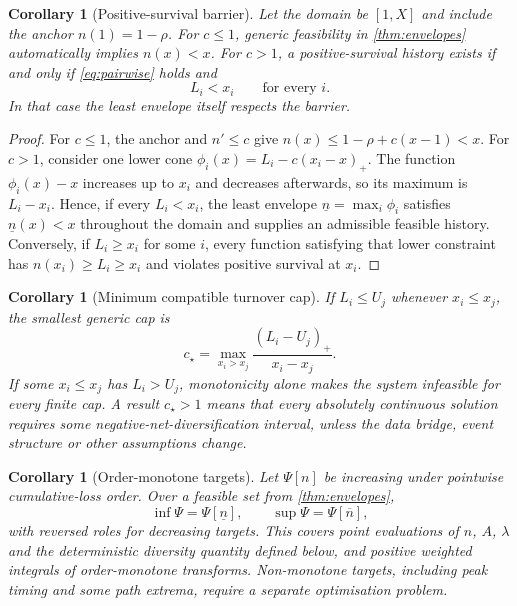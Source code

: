 \documentclass[11pt]{article}
\newtheorem{corollary}[theorem]{Corollary}
\theoremstyle{definition}
\begin{document}
\begin{corollary}[Positive-survival barrier]\label{cor:barrier}
Let the domain be $[1,X]$ and include the anchor $n(1)=1-\rho$. For $c\leq1$, generic feasibility in \cref{thm:envelopes} automatically implies $n(x)<x$. For $c>1$, a positive-survival history exists if and only if \eqref{eq:pairwise} holds and
\begin{equation}
 L_i<x_i\qquad\text{for every }i. \label{eq:barrierfinite}
\end{equation}
In that case the least envelope itself respects the barrier.
\end{corollary}

\begin{proof}
For $c\leq1$, the anchor and $n'\leq c$ give $n(x)\leq1-\rho+c(x-1)<x$. For $c>1$, consider one lower cone $\phi_i(x)=L_i-c(x_i-x)_+$. The function $\phi_i(x)-x$ increases up to $x_i$ and decreases afterwards, so its maximum is $L_i-x_i$. Hence, if every $L_i<x_i$, the least envelope $\underline n=\max_i\phi_i$ satisfies $\underline n(x)<x$ throughout the domain and supplies an admissible feasible history. Conversely, if $L_i\geq x_i$ for some $i$, every function satisfying that lower constraint has $n(x_i)\geq L_i\geq x_i$ and violates positive survival at $x_i$.
\end{proof}

\begin{corollary}[Minimum compatible turnover cap]\label{cor:mincap}
If $L_i\leq U_j$ whenever $x_i\leq x_j$, the smallest generic cap is
\begin{equation}
 c_\star=\max_{x_i>x_j}\frac{(L_i-U_j)_+}{x_i-x_j}. \label{eq:cstar}
\end{equation}
If some $x_i\leq x_j$ has $L_i>U_j$, monotonicity alone makes the system infeasible for every finite cap. A result $c_\star>1$ means that every absolutely continuous solution requires some negative-net-diversification interval, unless the data bridge, event structure or other assumptions change.
\end{corollary}

\begin{corollary}[Order-monotone targets]\label{cor:order}
Let $\Psi[n]$ be increasing under pointwise cumulative-loss order. Over a feasible set from \cref{thm:envelopes},
\[
 \inf\Psi=\Psi[\underline n],\qquad \sup\Psi=\Psi[\overline n],
\]
with reversed roles for decreasing targets. This covers point evaluations of $n$, $A$, $\lambda$ and the deterministic diversity quantity defined below, and positive weighted integrals of order-monotone transforms. Non-monotone targets, including peak timing and some path extrema, require a separate optimisation problem.
\end{corollary}
\end{document}

